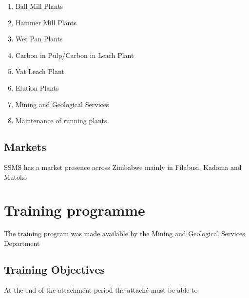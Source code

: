 \begin{enumerate}
\item \textbf{ }Ball Mill Plants

\item  Hammer Mill Plants

\item  Wet Pan Plants

\item  Carbon in Pulp/Carbon in Leach Plant

\item  Vat Leach Plant

\item  Elution Plants

\item  Mining and Geological Services

\item  Maintenance of running plants
\end{enumerate}


\subsection{ Markets}

\noindent SSMS has a market presence across Zimbabwe mainly in Filabusi, Kadoma and Mutoko\par


\section{ Training programme}

\noindent The training program was made available by the Mining and Geological Services Department \par


\subsection{ Training Objectives}

\noindent At the end of the attachment period the attach\'{e} must be able to 

